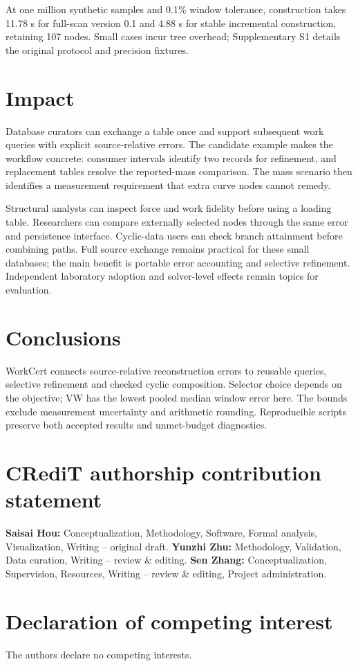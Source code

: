 \documentclass[preprint,12pt,a4paper]{elsarticle}
\begin{document}
At one million synthetic samples and 0.1\% window tolerance, construction takes 11.78 s for full-scan version 0.1 and 4.88 s for stable incremental construction, retaining 107 nodes. Small cases incur tree overhead; Supplementary S1 details the original protocol and precision fixtures.

\section{Impact}
Database curators can exchange a table once and support subsequent work queries with explicit source-relative errors. The candidate example makes the workflow concrete: consumer intervals identify two records for refinement, and replacement tables resolve the reported-mass comparison. The mass scenario then identifies a measurement requirement that extra curve nodes cannot remedy.

Structural analysts can inspect force and work fidelity before using a loading table. Researchers can compare externally selected nodes through the same error and persistence interface. Cyclic-data users can check branch attainment before combining paths. Full source exchange remains practical for these small databases; the main benefit is portable error accounting and selective refinement. Independent laboratory adoption and solver-level effects remain topics for evaluation.

\FloatBarrier
\section{Conclusions}
WorkCert connects source-relative reconstruction errors to reusable queries, selective refinement and checked cyclic composition. Selector choice depends on the objective; VW has the lowest pooled median window error here. The bounds exclude measurement uncertainty and arithmetic rounding. Reproducible scripts preserve both accepted results and unmet-budget diagnostics.
\section*{CRediT authorship contribution statement}
\textbf{Saisai Hou:} Conceptualization, Methodology, Software, Formal analysis, Visualization, Writing -- original draft.
\textbf{Yunzhi Zhu:} Methodology, Validation, Data curation, Writing -- review \& editing.
\textbf{Sen Zhang:} Conceptualization, Supervision, Resources, Writing -- review \& editing, Project administration.
\section*{Declaration of competing interest}
The authors declare no competing interests.
\end{document}
